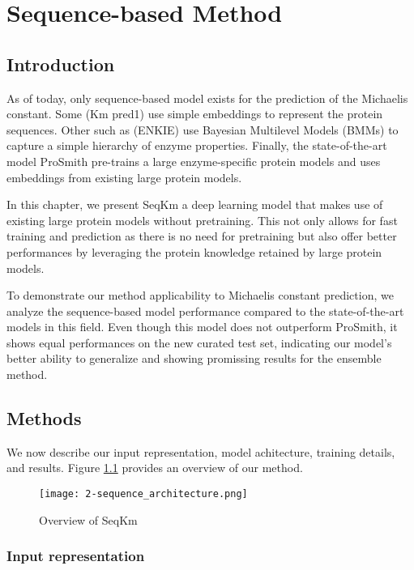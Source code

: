 
\chapter{Sequence-based Method}

\section{Introduction}

As of today, only sequence-based model exists for the prediction of the Michaelis constant. Some (Km pred1) use
simple embeddings to represent the protein sequences. Other such as (ENKIE) use Bayesian Multilevel Models (BMMs)
to capture a simple hierarchy of enzyme properties. Finally, the state-of-the-art model ProSmith pre-trains a
large enzyme-specific protein models and uses embeddings from existing large protein models. 

In this chapter, we present SeqKm a deep learning model that makes use of existing large protein models without
pretraining. This not only allows for fast training and prediction as there is no need for pretraining but also
offer better performances by leveraging the protein knowledge retained by large protein models.

To demonstrate our method applicability to Michaelis constant prediction, we analyze the sequence-based
model performance compared to the state-of-the-art models in this field. Even though this model
does not outperform ProSmith, it shows equal performances on the new curated test set, indicating our
model's better ability to generalize and showing promissing results for the ensemble method.

\section{Methods}

We now describe our input representation, model achitecture, training details, and results. 
Figure \ref{fig:seqkm} provides an overview of our method.

\begin{figure}
  \centering
  \texttt{[image: 2-sequence\_architecture.png]}
  \caption{Overview of SeqKm}
  \label{fig:seqkm}
\end{figure}

\subsection{Input representation}

